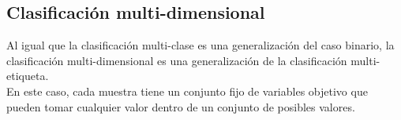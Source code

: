 \subsection{Clasificación multi-dimensional}
Al igual que la clasificación multi-clase es una generalización del caso binario, la clasificación multi-dimensional es una generalización de la clasificación multi-etiqueta.\\
En este caso, cada muestra tiene un conjunto fijo de variables objetivo que pueden tomar cualquier valor dentro de un conjunto de posibles valores.